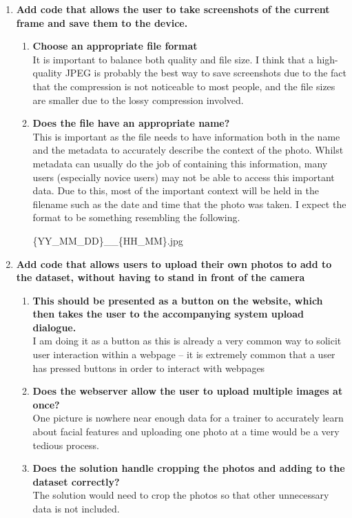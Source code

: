 \documentclass[9pt]{article}
\newenvironment{tightcenter}{%
	\setlength\topsep{2pt}%
	\setlength\parskip{3pt}%
	\par\centering}{\par\noindent\ignorespacesafterend}
\begin{document}
\begin{small}
\begin{enumerate}
		\item \textbf{Add code that allows the user to take screenshots of the current frame and save them to the device.}
		\begin{enumerate}
			\item \textbf{Choose an appropriate file format}\\
				It is important to balance both quality and file size. I think that a high-quality JPEG is probably the best way to save screenshots due to the fact that the compression is not noticeable to most people, and the file sizes are smaller due to the lossy compression involved.
			\item \textbf{Does the file have an appropriate name?}\\
				This is important as the file needs to have information both in the name and the metadata to accurately describe the context of the photo. Whilst metadata can usually do the job of containing this information, many users (especially novice users) may not be able to access this important data. Due to this, most of the important context will be held in the filename such as the date and time that the photo was taken. I expect the format to be something resembling the following.
				\begin{tightcenter}
					{\{YY\_MM\_DD\}\_\_\{HH\_MM\}.jpg}
				\end{tightcenter}
		\end{enumerate}
		
		\item \textbf{Add code that allows users to upload their own photos to add to the dataset, without having to stand in front of the camera}
		\begin{enumerate}
			\item \textbf{This should be presented as a button on the website, which then takes the user to the accompanying system upload dialogue.}\\
				I am doing it as a button as this is already a very common way to solicit user interaction within a webpage – it is extremely common that a user has pressed buttons in order to interact with webpages
			\item \textbf{Does the webserver allow the user to upload multiple images at once?}\\
				One picture is nowhere near enough data for a trainer to accurately learn about facial features and uploading one photo at a time would be a very tedious process. 
			\item \textbf{Does the solution handle cropping the photos and adding to the dataset correctly?}\\
				The solution would need to crop the photos so that other unnecessary data is not included.
		\end{enumerate}
		

\end{enumerate}
\end{small}
\end{document}
